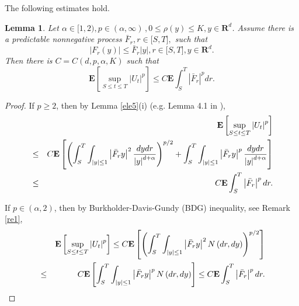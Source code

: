 \documentclass[11pt]{amsart}
\theoremstyle{plain}
\newtheorem{lemma}{Lemma}
\numberwithin{equation}{section}
\begin{document}
The following estimates hold.

\begin{lemma}
\label{ele1}Let $\alpha \in \lbrack 1,2),p\in \left( \alpha ,\infty \right)
\,,0\leq \rho \left( y\right) \leq K,y\in \mathbf{R}^{d}$. Assume there is a
predictable nonnegative process $\bar{F}_{r},r\in \lbrack S,T],$ such that\begin{equation*}
\left\vert F_{r}\left( y\right) \right\vert \leq \bar{F}_{r}\left\vert
y\right\vert ,r\in \lbrack S,T],y\in \mathbf{R}^{d}.
\end{equation*}
Then there is $C=C\left( d,p,\alpha ,K\right) $ such that\begin{equation*}
\mathbf{E}\left[ \sup_{S\leq t\leq T}\left\vert U_{t}\right\vert ^{p}\right]
\leq C\mathbf{E}\int_{S}^{T}\left\vert \bar{F}_{r}\right\vert ^{p}dr .
\end{equation*}
\end{lemma}

\begin{proof}
If $p\geq 2$, then by Lemma \ref{ele5}(i) (e.g. Lemma 4.1 in \cite{lm}),\begin{eqnarray}
&&\mathbf{E}\left[ \sup_{S\leq t\leq T}\left\vert U_{t}\right\vert ^{p}\right]  \label{fo3} \\
&\leq &C\mathbf{E}\left[ \left( \int_{S}^{T}\int_{\left\vert y\right\vert
\leq 1}\left\vert \bar{F}_{r}y\right\vert ^{2}\frac{dydr}{\left\vert
y\right\vert ^{d+\alpha }}\right) ^{p/2}+\int_{S}^{T}\int_{\left\vert
y\right\vert \leq 1}\left\vert \bar{F}_{r}y\right\vert ^{p}\frac{dydr}{\left\vert y\right\vert ^{d+\alpha }}\right]  \notag \\
&\leq &C\mathbf{E}\int_{S}^{T}\left\vert \bar{F}_{r}\right\vert ^{p}dr. 
\notag
\end{eqnarray}

If $p\in \left( \alpha ,2\right) $, then by Burkholder-Davis-Gundy (BDG)
inequality, see Remark \ref{re1}, 
\begin{eqnarray}
&&\mathbf{E}\left[ \sup_{S\leq t\leq T}\left\vert U_{t}\right\vert ^{p}\right] \leq C\mathbf{E}\left[ \left( \int_{S}^{T}\int_{\left\vert
y\right\vert \leq 1}\left\vert \bar{F}_{r}y\right\vert ^{2}N\left(
dr,dy\right) \right) ^{p/2}\right]  \label{fo4} \\
&\leq &C\mathbf{E}\left[ \int_{S}^{T}\int_{\left\vert y\right\vert \leq
1}\left\vert \bar{F}_{r}y\right\vert ^{p}N\left( dr,dy\right) \right] \leq C\mathbf{E}\int_{S}^{T}\left\vert \bar{F}_{r}\right\vert ^{p}dr.  \notag
\end{eqnarray}
\end{proof}
\end{document}
